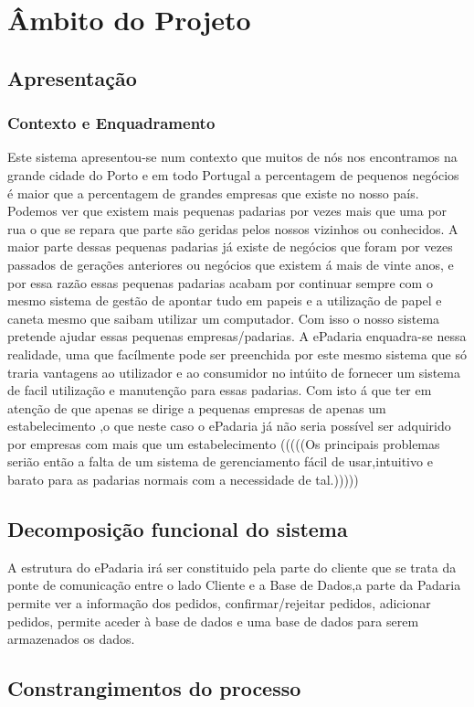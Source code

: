 \chapter{Âmbito do Projeto}
\label{ambito}
\section{Apresentação}
\subsection{Contexto e Enquadramento}
Este sistema apresentou-se num contexto que muitos de nós nos encontramos na grande cidade do Porto e em todo Portugal a percentagem de pequenos negócios é maior que a percentagem de grandes empresas que existe no nosso país. Podemos ver que existem mais pequenas padarias por vezes mais que uma por rua o que se repara que parte são geridas pelos nossos vizinhos ou conhecidos. A maior parte dessas pequenas padarias já existe de negócios que foram por vezes passados de gerações anteriores ou negócios que existem á mais de vinte anos, e por essa razão essas pequenas padarias acabam por continuar sempre com o mesmo sistema de gestão de apontar tudo em papeis e a utilização de papel e caneta mesmo que saibam utilizar um computador. Com isso o nosso sistema pretende ajudar essas pequenas empresas/padarias.
A ePadaria enquadra-se nessa realidade, uma que facílmente pode ser preenchida por este mesmo sistema que só traria vantagens ao utilizador e ao consumidor no intúito de fornecer um sistema de facil utilização e manutenção para essas padarias. 
Com isto á que ter em atenção de que apenas se dirige a pequenas empresas de apenas um estabelecimento ,o que neste caso o ePadaria já não seria possível ser adquirido por empresas com mais que um estabelecimento
(((((Os principais problemas serião então a falta de um sistema de gerenciamento fácil de usar,intuitivo e barato para as padarias normais com a necessidade de tal.)))))
\section{Decomposição funcional do sistema}
A estrutura do ePadaria irá ser constituido pela parte do cliente que se trata da ponte de comunicação entre o lado Cliente e a Base de Dados,a parte da Padaria permite ver a informação dos pedidos, confirmar/rejeitar pedidos, adicionar pedidos, permite aceder à base de dados e uma base de dados para serem armazenados os dados.
\section{Constrangimentos do processo}
